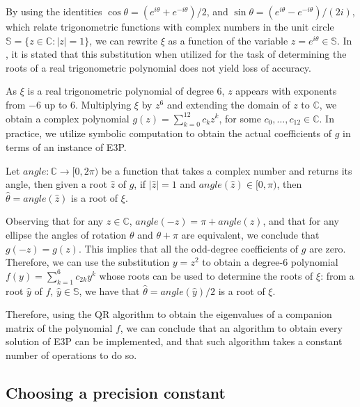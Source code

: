 By using the identities $\cos{\theta} = (e^{i\theta} + e^{-i\theta})/2$, and $\sin{\theta} = (e^{i\theta} - e^{-i\theta})/(2i)$, which relate trigonometric functions with complex numbers in the unit circle $\mathbb{S}=\{z\in \mathbb{C}\colon |z|=1\}$, we can rewrite $\xi$ as a function of the variable $z=e^{i\theta}\in\mathbb{S}$. In \cite{weidner}, it is stated that this substitution when utilized for the task of determining the roots of a real trigonometric polynomial does not yield loss of accuracy.

As $\xi$ is a real trigonometric polynomial of degree $6$, $z$ appears with exponents from $-6$ up to $6$. Multiplying $\xi$ by $z^6$ and extending the domain of $z$ to $\mathbb{C}$, we obtain a complex polynomial $g(z)=\sum_{k=0}^{12} c_k z^k$, for some $c_0, \dots, c_{12} \in \mathbb{C}$. In practice, we utilize symbolic computation to obtain the actual coefficients of $g$ in terms of an instance of E3P.

Let $angle \colon \mathbb{C} \to [0, 2\pi)$ be a function that takes a complex number and returns its angle, then given a root $\hat{z}$ of $g$, if $|\hat{z}|=1$ and $angle(\hat{z}) \in [0, \pi)$, then $\hat{\theta} = angle(\hat{z})$ is a root of $\xi$. 

Observing that for any $z\in \mathbb{C}$, $angle(-z)=\pi+angle(z)$, and that for any ellipse the angles of rotation $\theta$ and $\theta + \pi$ are equivalent, we conclude that $g(-z)=g(z)$. This implies that all the odd-degree coefficients of $g$ are zero. Therefore, we can use the substitution $y=z^2$ to obtain a degree-$6$ polynomial $f(y)=\sum_{k=1}^6 c_{2k} y^k$ whose roots can be used to determine the roots of $\xi$: from a root $\hat{y}$ of $f$, $\hat{y}\in\mathbb{S}$, we have that $\hat{\theta}=angle(\hat{y})/2$ is a root of $\xi$.

Therefore, using the QR algorithm to obtain the eigenvalues of a companion matrix of the polynomial $f$, we can conclude that an algorithm to obtain every solution of E3P can be implemented, and that such algorithm takes a constant number of operations to do so.


\subsection{Choosing a precision constant}

